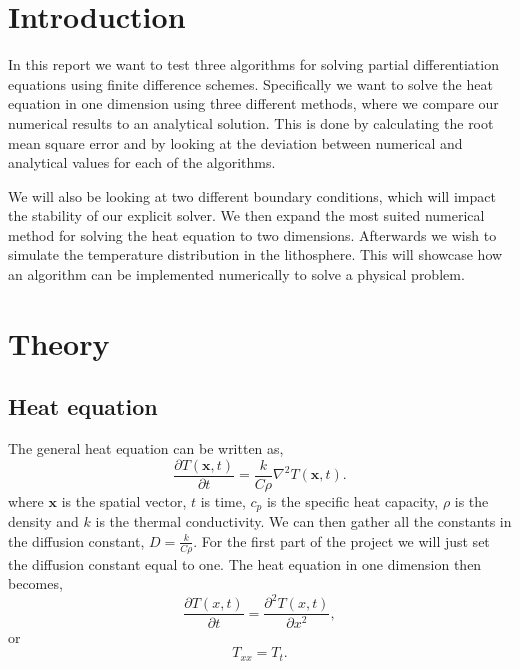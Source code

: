 \documentclass{article}
\begin{document}
\begin{multicols}{2}

\section{Introduction}

In this report we want to test three algorithms for solving partial differentiation equations using finite difference schemes. Specifically we want to solve the heat equation in one dimension using three different methods, where we compare our numerical results to an analytical solution. This is done by calculating the root mean square error and by looking at the deviation between numerical and analytical values for each of the algorithms. 

We will also be looking at two different boundary conditions, which will impact the stability of our explicit solver. We then expand the most suited numerical method for solving the heat equation to two dimensions. Afterwards we wish to simulate the temperature distribution in the lithosphere. This will showcase how an algorithm can be implemented numerically to solve a physical problem. 

\section{Theory}

\subsection{Heat equation}

The general heat equation can be written as,
\begin{equation}
	\frac{\partial T(\textbf{x}, t)}{\partial t} = \frac{k}{C\rho}\nabla^2 T(\textbf{x}, t). \label{eq:gen_heat}
\end{equation}
where $\textbf{x}$ is the spatial vector, $t$ is time, $c_p$ is the specific heat capacity, $\rho$ is the density and $k$ is the thermal conductivity. We can then gather all the constants in the diffusion constant, $D=\frac{k}{C\rho}$. For the first part of the project we will just set the diffusion constant equal to one. The heat equation in one dimension then becomes, 
\begin{equation}
	\frac{\partial T(x,t)}{\partial t} = \frac{\partial^2 T(x,t)}{\partial x^2}, \label{eq:heat_one}
\end{equation}
or 
\begin{equation}
	T_{xx}=T_t.
\end{equation}

\end{multicols}
\end{document}
